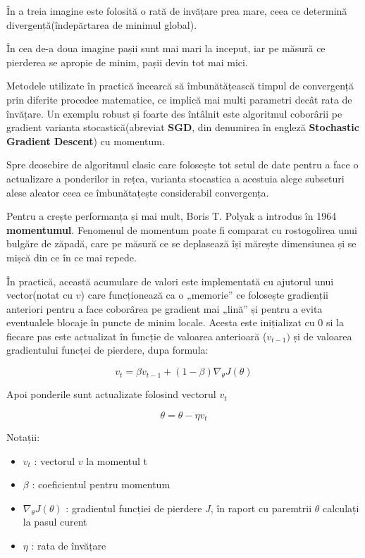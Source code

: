 În a treia imagine este folosită o rată de invățare prea mare, ceea ce determină divergență(îndepărtarea de minimul global). 

În cea de-a doua imagine pașii sunt mai mari la inceput, iar pe măsură ce pierderea se apropie de minim, pașii devin tot mai mici.

Metodele utilizate în practică încearcă să îmbunătățească timpul de convergență prin diferite procedee matematice, ce implică mai multi parametri decât rata de învățare. Un exemplu robust și foarte des întâlnit este algoritmul coborârii pe gradient varianta stocastică(abreviat \textbf{SGD}, din denumirea în engleză \textbf{Stochastic Gradient Descent}) cu momentum. 

Spre deosebire de algoritmul clasic care folosește tot setul de date pentru a face o actualizare a ponderilor in rețea, varianta stocastica a acestuia alege subseturi alese aleator ceea ce îmbunătațește considerabil convergența. 

Pentru a crește performanța și mai mult, Boris T. Polyak\cite{polyak1964some} a introdus în 1964 \textbf{momentumul}. Fenomenul de momentum poate fi comparat cu rostogolirea unui bulgăre de zăpadă, care pe măsură ce se deplasează își mărește dimensiunea și se mișcă din ce în ce mai repede. 

În practică, această acumulare de valori este implementată cu ajutorul unui vector(notat cu $v$) care funcționează ca o „memorie” ce folosește gradienții anteriori pentru a face coborârea pe gradient mai „lină” și pentru a evita eventualele blocaje în puncte de minim locale. Acesta este inițializat cu 0 si la fiecare pas este actualizat în funcție de valoarea anterioară ($v_{t-1})$ și de valoarea gradientului funcței de pierdere, dupa formula:

\begin{equation}
    v_t = \beta v_{t-1} + (1 - \beta) \nabla_{\theta} J(\theta)
\end{equation}

Apoi ponderile sunt actualizate folosind vectorul $v_t$

\begin{equation}
    \theta = \theta - \eta v_t
\end{equation}

\newpage

Notații:

\begin{itemize}
    \item $v_t$ : vectorul $v$ la momentul t
    \item $\beta$ : coeficientul pentru momentum
    \item $\nabla_{\theta} J(\theta)$ : gradientul funcției de pierdere $J$, în raport cu paremtrii $\theta$ calculați la pasul curent
    \item $\eta$ : rata de învățare
\end{itemize}

